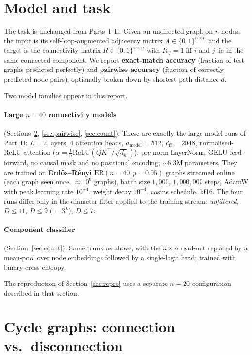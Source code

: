 \documentclass[11pt,a4paper]{article}
\begin{document}
\section{Model and task}
\label{sec:model}

The task is unchanged from Parts~I--II. Given an undirected graph on $n$ nodes,
the input is its self-loop-augmented adjacency matrix
$A \in \{0,1\}^{n \times n}$ and the target is the connectivity matrix
$R \in \{0,1\}^{n \times n}$ with $R_{ij} = 1$ iff $i$ and $j$ lie in the same
connected component. We report \textbf{exact-match accuracy} (fraction of test
graphs predicted perfectly) and \textbf{pairwise accuracy} (fraction of
correctly predicted node pairs), optionally broken down by shortest-path
distance $d$.

Two model families appear in this report.

\paragraph{Large $n = 40$ connectivity models} (Sections~\ref{sec:cycles},
\ref{sec:pairwise}, \ref{sec:count}). These are exactly the large-model runs of
Part~II: $L = 2$ layers, $4$ attention heads, $d_{\mathrm{model}} = 512$,
$d_{\mathrm{ff}} = 2048$, normalised-ReLU attention
($\alpha = \tfrac{1}{n}\mathrm{ReLU}(QK^\top/\sqrt{d_h})$), pre-norm
LayerNorm, GELU feed-forward, no causal mask and no positional encoding;
$\sim 6.3$M parameters. They are trained on \textbf{Erd\H{o}s--R\'enyi
$\mathrm{ER}(n = 40, p = 0.05)$} graphs streamed online (each graph seen once,
$\approx 10^9$ graphs), batch size $1{,}000$, $1{,}000{,}000$ steps, AdamW with
peak learning rate $10^{-4}$, weight decay $10^{-4}$, cosine schedule, bf16.
The four runs differ only in the diameter filter applied to the training
stream: \emph{unfiltered}, $D \le 11$, $D \le 9$ ($= 3^L$), $D \le 7$.

\paragraph{Component classifier} (Section~\ref{sec:count}). Same trunk as
above, with the $n \times n$ read-out replaced by a mean-pool over node
embeddings followed by a single-logit head; trained with binary cross-entropy.

The reproduction of Section~\ref{sec:repro} uses a separate $n = 20$
configuration described in that section.

\section{Cycle graphs: connection vs.\ disconnection}
\label{sec:cycles}
\end{document}
